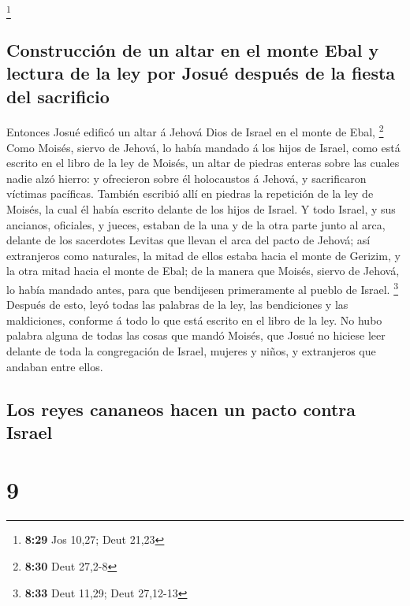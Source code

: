 \footnote{\textbf{8:29} Jos 10,27; Deut 21,23}

\hypertarget{construcciuxf3n-de-un-altar-en-el-monte-ebal-y-lectura-de-la-ley-por-josuuxe9-despuuxe9s-de-la-fiesta-del-sacrificio}{%
\subsection{Construcción de un altar en el monte Ebal y lectura de la
ley por Josué después de la fiesta del
sacrificio}\label{construcciuxf3n-de-un-altar-en-el-monte-ebal-y-lectura-de-la-ley-por-josuuxe9-despuuxe9s-de-la-fiesta-del-sacrificio}}

 Entonces Josué edificó un altar á Jehová Dios de Israel
en el monte de Ebal, \footnote{\textbf{8:30} Deut 27,2-8}
 Como Moisés, siervo de Jehová, lo había mandado á los
hijos de Israel, como está escrito en el libro de la ley de Moisés, un
altar de piedras enteras sobre las cuales nadie alzó hierro: y
ofrecieron sobre él holocaustos á Jehová, y sacrificaron víctimas
pacíficas.  También escribió allí en piedras la
repetición de la ley de Moisés, la cual él había escrito delante de los
hijos de Israel.  Y todo Israel, y sus ancianos,
oficiales, y jueces, estaban de la una y de la otra parte junto al arca,
delante de los sacerdotes Levitas que llevan el arca del pacto de
Jehová; así extranjeros como naturales, la mitad de ellos estaba hacia
el monte de Gerizim, y la otra mitad hacia el monte de Ebal; de la
manera que Moisés, siervo de Jehová, lo había mandado antes, para que
bendijesen primeramente al pueblo de Israel. \footnote{\textbf{8:33}
  Deut 11,29; Deut 27,12-13}  Después de esto, leyó todas
las palabras de la ley, las bendiciones y las maldiciones, conforme á
todo lo que está escrito en el libro de la ley.  No hubo
palabra alguna de todas las cosas que mandó Moisés, que Josué no hiciese
leer delante de toda la congregación de Israel, mujeres y niños, y
extranjeros que andaban entre ellos.

\hypertarget{los-reyes-cananeos-hacen-un-pacto-contra-israel}{%
\subsection{Los reyes cananeos hacen un pacto contra
Israel}\label{los-reyes-cananeos-hacen-un-pacto-contra-israel}}

\hypertarget{section-8}{%
\section{9}\label{section-8}}

